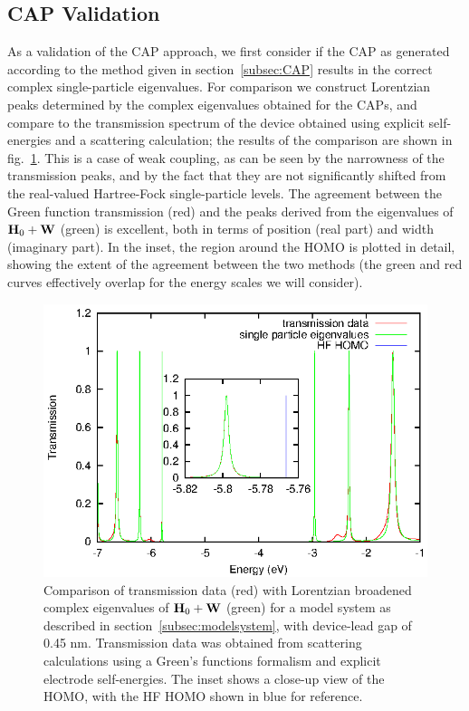 \subsection{\ac{CAP} Validation}
\label{subsec:SingleParticle}

As a validation of the \ac{CAP} approach, we first consider if
the \ac{CAP} as generated according to the method given in
section~\ref{subsec:CAP} results in the correct complex single-particle
eigenvalues.
For comparison we construct Lorentzian peaks determined by the complex
eigenvalues obtained for the \acp{CAP}, and compare to the transmission
spectrum of the device obtained using explicit self-energies and a scattering
calculation; the results of the comparison are shown in fig.~\ref{fig:13evals}.
This is a case of weak coupling, as can be seen by the narrowness of the
transmission peaks, and by the fact that they are not significantly shifted
from the real-valued Hartree-Fock single-particle levels. %
The agreement between the Green function transmission (red) and the peaks
derived from the eigenvalues of $\mathbf{H}_0 + \mathbf{W}$ (green) is excellent,
both in terms of position (real part) and width (imaginary part). In the inset,
the region around the \ac{HOMO} is plotted in detail, showing the extent of
the agreement between the two methods (the green and red curves effectively
overlap for the energy scales we will consider).

\begin{figure} 
	\begin{center}
		\includegraphics[width=0.9\linewidth]{figures/13evals}
	\end{center}
	\caption{Comparison of transmission data (red) with Lorentzian
	broadened complex eigenvalues of $\mathbf{H}_0 + \mathbf{W}$ (green) for a
	model system as described in section~\ref{subsec:modelsystem}, with
	device-lead gap of 0.45 nm. Transmission data was obtained from
	scattering calculations using a Green's functions formalism and
	explicit electrode self-energies.
	The inset shows a close-up view of the \ac{HOMO}, with the HF \ac{HOMO}
	shown in blue for reference.
	}
	\label{fig:13evals}
\end{figure}

